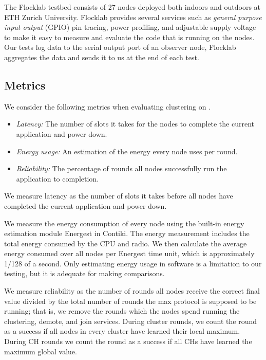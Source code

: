 The Flocklab testbed consists of 27 nodes deployed both indoors and outdoors at ETH Zurich University. Flocklab provides several services such as \textit{general purpose input output} (GPIO) pin tracing, power profiling, and adjustable supply voltage \cite{Lim2013-flocklab-introduction} to make it easy to measure and evaluate the code that is running on the nodes. Our tests log data to the serial output port of an observer node, Flocklab aggregates the data and sends it to us at the end of each test.

\subsection{Metrics}
We consider the following metrics when evaluating clustering on \atwo{}.

\begin{itemize}
    \item \textit{Latency:} The number of slots it takes for the nodes to complete the current application and power down.
    \item \textit{Energy usage:} An estimation of the energy every node uses per round.
    \item \textit{Reliability:} The percentage of rounds all nodes successfully run the application to completion.
\end{itemize}

We measure latency as the number of slots it takes before all nodes have completed the current application and power down.

We measure the energy consumption of every node using the built-in energy estimation module Energest in Contiki. The energy measurement includes the total energy consumed by the CPU and radio. We then calculate the average energy consumed over all nodes per Energest time unit, which is approximately 1/128 of a second. Only estimating energy usage in software is a limitation to our testing, but it is adequate for making comparisons.

We measure reliability as the number of rounds all nodes receive the correct final value divided by the total number of rounds the max protocol is supposed to be running; that is, we remove the rounds which the nodes spend running the clustering, demote, and join services. During cluster rounds, we count the round as a success if all nodes in every cluster have learned their local maximum. During CH rounds we count the round as a success if all CHs have learned the maximum global value.

